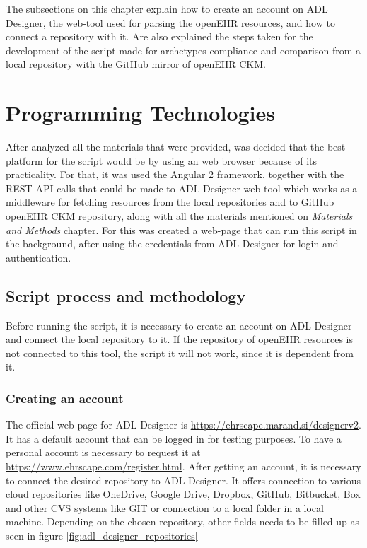 \documentclass[mim_thesis.tex]{subfiles}
\begin{document}
The subsections on this chapter explain how to create an account on ADL Designer, the web-tool used for parsing the openEHR resources, and how to connect a repository with it. Are also explained the steps taken for the development of the script made for archetypes compliance and comparison from a local repository with the GitHub mirror of openEHR CKM.  


\section{Programming Technologies}
After analyzed all the materials that were provided, was decided that the best platform for the script would be by using an web browser because of its practicality. For that, it was used the Angular 2 framework, together with the REST API calls that could be made to ADL Designer web tool which works as a middleware for fetching resources from the local repositories and to GitHub openEHR CKM repository, along with all the materials mentioned on \textit{Materials and Methods} chapter. For this was created a web-page that can run this script in the background, after using the credentials from ADL Designer for login and authentication.


\subsection{Script process and methodology}

Before running the script, it is necessary to create an account on ADL Designer and connect the local repository to it. If the repository of openEHR resources is not connected to this tool, the script it will not work, since it is dependent from it.

\subsubsection{Creating an account}
The official web-page for ADL Designer is \url{https://ehrscape.marand.si/designerv2}. It has a default account that can be logged in for testing purposes. To have a personal account is necessary to request it at \url{https://www.ehrscape.com/register.html}.
After getting an account, it is necessary to connect the desired repository to ADL Designer. It offers connection to various cloud repositories like OneDrive, Google Drive, Dropbox, GitHub, Bitbucket, Box and other CVS systems like GIT or connection to a local folder in a local machine. Depending on the chosen repository, other fields needs to be filled up as seen in figure \ref{fig:adl_designer_repositories}
\end{document}
